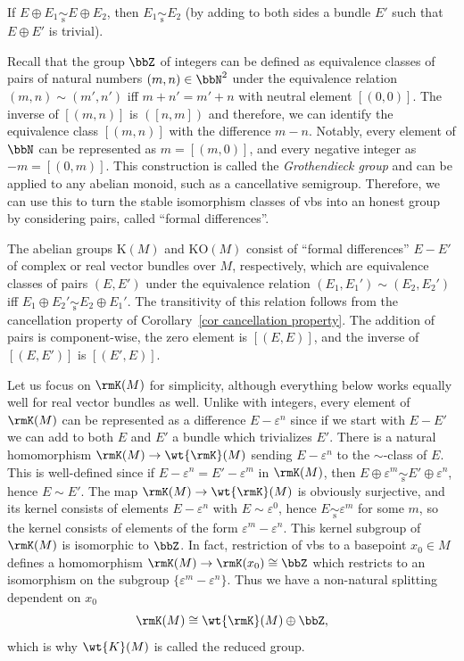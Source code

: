 \begin{cor}\label{cor cancellation property}
    If $E\oplus E_1\underset{\mathrm{s}}{\sim} E\oplus E_2$, then $E_1\underset{\mathrm{s}}{\sim}E_2$ (by adding to both sides a bundle $E'$ such that $E\oplus E'$ is trivial).
\end{cor}

Recall that the group $\bbZ$ of integers can be defined as equivalence classes of pairs of natural numbers $(m,n)\in \bbN^2$ under the equivalence relation $(m,n)\sim (m',n')$ iff $m+n'=m'+n$ with neutral element $[(0,0)]$. The inverse of $[(m,n)]$ is $([n,m])$ and therefore, we can identify the equivalence class $[(m,n)]$ with the difference $m-n$. Notably, every element of $\bbN$ can be represented as $m=[(m,0)]$, and every negative integer as $-m=[(0,m)]$. This construction is called the \emph{Grothendieck group} and can be applied to any abelian monoid, such as a cancellative semigroup. Therefore, we can use this to turn the stable isomorphism classes of \glspl{vb} into an honest group by considering pairs, called ``formal differences''.

\begin{defn}[K-groups]
    The abelian groups $\mathrm{K}(M)$ and $\mathrm{KO}(M)$ consist of ``formal differences'' $E-E'$ of complex or real vector bundles over $M$, respectively, which are equivalence classes of pairs $(E,E')$ under the equivalence relation $(E_1,E_1')\sim (E_2,E_2')$ iff $E_1\oplus E_2'\underset{\mathrm{s}}{\sim} E_2\oplus E_1'$. The transitivity of this relation follows from the cancellation property of Corollary~\ref{cor cancellation property}. The addition of pairs is component-wise, the zero element is $[(E,E)]$, and the inverse of $[(E,E')]$ is $[(E',E)]$.
\end{defn}

Let us focus on $\rmK(M)$ for simplicity, although everything below works equally well for real vector bundles as well. Unlike with integers, every element of $\rmK(M)$ can be represented as a difference $E-\varepsilon^n$ since if we start with $E-E'$ we can add to both $E$ and $E'$ a bundle which trivializes $E'$. There is a natural homomorphism $\rmK(M)\to \wt{\rmK}(M)$ sending $E-\varepsilon^n$ to the $\sim$-class of $E$. This is well-defined since if $E-\varepsilon^n=E'-\varepsilon^m$ in $\rmK(M)$, then $E\oplus \varepsilon^m\underset{\mathrm{s}}{\sim} E'\oplus \varepsilon^n$, hence $E\sim E'$. The map $\rmK(M)\to\wt{\rmK}(M)$ is obviously surjective, and its kernel consists of elements $E-\varepsilon^n$ with $E\sim \varepsilon^0$, hence $E\underset{\mathrm{s}}{\sim}\varepsilon^m$ for some $m$, so the kernel consists of elements of the form $\varepsilon^m-\varepsilon^n$. This kernel subgroup of $\rmK(M)$ is isomorphic to $\bbZ$. In fact, restriction of \glspl{vb} to a basepoint $x_0\in M$ defines a homomorphism $\rmK(M)\to \rmK(x_0)\cong \bbZ$ which restricts to an isomorphism on the subgroup $\{\varepsilon^m-\varepsilon^n\}$. Thus we have a non-natural splitting dependent on $x_0$
\[\rmK(M)\cong \wt{\rmK}(M)\oplus \bbZ,\]
which is why $\wt{K}(M)$ is called the reduced group.

